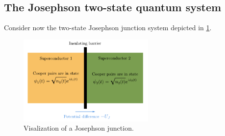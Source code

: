 \documentclass{report}
\numberwithin{tm}{section}
\begin{document}
\subsection{The Josephson two-state quantum system}
Consider now the two-state Josephson junction system depicted in \cref{fig:josephson_junction}.
\begin{figure}[h]
	\centering
	\includegraphics[width=0.6\textwidth]{figures/josephson_junction.pdf}
	\caption{Visalization of a Josephson junction.}
	\label{fig:josephson_junction}
\end{figure}
\end{document}
